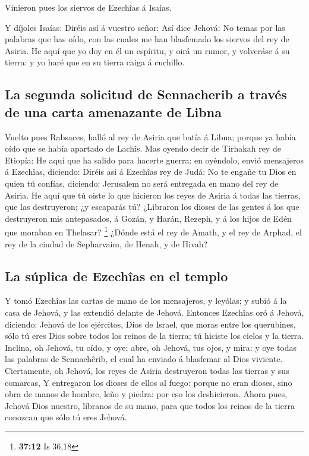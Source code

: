  Vinieron pues los siervos de Ezechîas á Isaías.

 Y díjoles Isaías: Diréis así á vuestro señor: Así dice
Jehová: No temas por las palabras que has oído, con las cuales me han
blasfemado los siervos del rey de Asiria.  He aquí que yo
doy en él un espíritu, y oirá un rumor, y volveráse á su tierra: y yo
haré que en su tierra caiga á cuchillo.

\hypertarget{la-segunda-solicitud-de-sennacherib-a-travuxe9s-de-una-carta-amenazante-de-libna}{%
\subsection{La segunda solicitud de Sennacherib a través de una carta
amenazante de
Libna}\label{la-segunda-solicitud-de-sennacherib-a-travuxe9s-de-una-carta-amenazante-de-libna}}

 Vuelto pues Rabsaces, halló al rey de Asiria que batía á
Libna; porque ya había oído que se había apartado de Lachîs.
 Mas oyendo decir de Tirhakah rey de Etiopía: He aquí que
ha salido para hacerte guerra: en oyéndolo, envió mensajeros á Ezechîas,
diciendo:  Diréis así á Ezechîas rey de Judá: No te
engañe tu Dios en quien tú confías, diciendo: Jerusalem no será
entregada en mano del rey de Asiria.  He aquí que tú
oiste lo que hicieron los reyes de Asiria á todas las tierras, que las
destruyeron; ¿y escaparás tú?  ¿Libraron los dioses de
las gentes á los que destruyeron mis antepasados, á Gozán, y Harán,
Rezeph, y á los hijos de Edén que moraban en Thelasar? \footnote{\textbf{37:12}
  Is 36,18}  ¿Dónde está el rey de Amath, y el rey de
Arphad, el rey de la ciudad de Sepharvaim, de Henah, y de Hivah?

\hypertarget{la-suxfaplica-de-ezechuxeeas-en-el-templo}{%
\subsection{La súplica de Ezechîas en el
templo}\label{la-suxfaplica-de-ezechuxeeas-en-el-templo}}

 Y tomó Ezechîas las cartas de mano de los mensajeros, y
leyólas; y subió á la casa de Jehová, y las extendió delante de Jehová.
 Entonces Ezechîas oró á Jehová, diciendo:
 Jehová de los ejércitos, Dios de Israel, que moras entre
los querubines, sólo tú eres Dios sobre todos los reinos de la tierra;
tú hiciste los cielos y la tierra.  Inclina, oh Jehová,
tu oído, y oye; abre, oh Jehová, tus ojos, y mira: y oye todas las
palabras de Sennachêrib, el cual ha enviado á blasfemar al Dios
viviente.  Ciertamente, oh Jehová, los reyes de Asiria
destruyeron todas las tierras y sus comarcas,  Y
entregaron los dioses de ellos al fuego: porque no eran dioses, sino
obra de manos de hombre, leño y piedra: por eso los deshicieron.
 Ahora pues, Jehová Dios nuestro, líbranos de su mano,
para que todos los reinos de la tierra conozcan que sólo tú eres Jehová.

